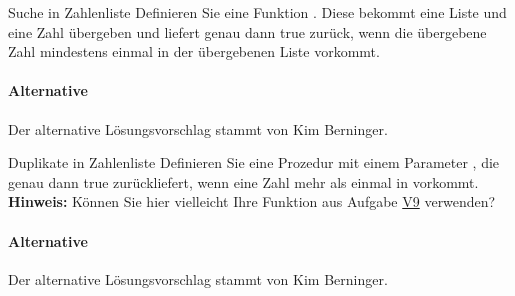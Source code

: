 \documentclass{../preamble}
\begin{document}
	\begin{task}[credit = \stars{2}{3}]{Suche in Zahlenliste}
	    \label{task:V9}
	    Definieren Sie eine Funktion . Diese bekommt eine Liste und eine Zahl übergeben und liefert genau dann \textcolor{keywordcolor}{true} zurück, wenn die übergebene  Zahl mindestens einmal in der übergebenen Liste vorkommt.
	
	    \begin{solution}
	        
	        
	        \paragraph{Alternative}
	        
	        Der alternative Lösungsvorschlag stammt von Kim Berninger.
	        
	    \end{solution}
	\end{task}
	
	\clearpage
	
	\begin{task}[credit = \stars{2}{3}]{Duplikate in Zahlenliste}
	    \label{task:V10}
	    Definieren Sie eine Prozedur  mit einem Parameter , die genau  dann \textcolor{keywordcolor}{true} zurückliefert, wenn eine Zahl mehr als einmal in  vorkommt.
	    \br
	    \textbf{Hinweis:} Können Sie hier vielleicht Ihre Funktion aus Aufgabe \hyperref[task:V9]{V9} verwenden?
	
	    \begin{solution}
	        
	        
	        \paragraph{Alternative}
	        
	        Der alternative Lösungsvorschlag stammt von Kim Berninger.
	        
	    \end{solution}
	\end{task}
	
	\clearpage
	
\end{document}
